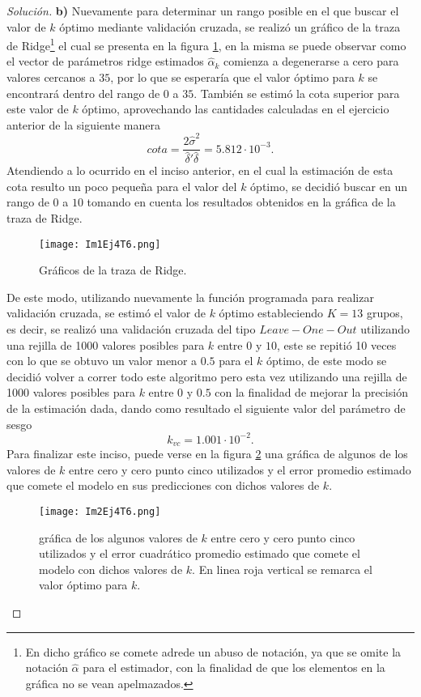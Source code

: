 \documentclass[10.5pt,notitlepage]{article}
\newenvironment{solucion}
  {\begin{proof}[Solución]}
  {\end{proof}}
\theoremstyle{plain}
\begin{document}
\begin{solucion}
\noindent\textbf{b)} Nuevamente para determinar un rango posible en el que buscar el valor de \(\mathit{k}\) óptimo mediante validación cruzada, se realizó un gráfico de la traza de Ridge\footnote{En dicho gráfico se comete adrede un abuso de notación, ya que se omite la notación \(\hat{\alpha}\) para el estimador, con la finalidad de que los elementos en la gráfica no se vean apelmazados.} el cual se presenta en la figura \ref{fig:11}, en la misma se puede observar como el vector de parámetros ridge estimados \(\hat{\alpha}_{k}\) comienza a degenerarse a cero para valores cercanos a \(35\), por lo que se esperaría que el valor óptimo para \(\mathit{k}\) se encontrará dentro del rango de \(0\) a \(35\). También se estimó la cota superior para este valor de \(k\) óptimo, aprovechando las cantidades calculadas en el ejercicio anterior de la siguiente manera 
\begin{equation*}
    cota = \frac{2\hat{\sigma}^2 }{\hat{\delta}'\hat{\delta}} = 5.812\cdot 10^{-3}.
\end{equation*}
Atendiendo a lo ocurrido en el inciso anterior, en el cual la estimación de esta cota resulto un poco pequeña para el valor del \(k\) óptimo, se decidió buscar en un rango de \(0\) a \(10\) tomando en cuenta los resultados obtenidos en la gráfica de la traza de Ridge. 
\begin{figure}[htb]
 \centering
 \texttt{[image: Im1Ej4T6.png]}
 \caption{Gráficos de la traza de Ridge.}
\label{fig:11}
\end{figure}
De este modo, utilizando nuevamente la función programada para realizar validación cruzada, se estimó el valor de \(k\) óptimo estableciendo \(K =13\) grupos, es decir, se realizó una validación cruzada del tipo \(Leave-One-Out\) utilizando una rejilla de 1000 valores posibles para \(k\) entre \(0\) y \(10\), este se repitió 10 veces con lo que se obtuvo un valor menor a \(0.5\) para el \(k\) óptimo, de este modo se decidió volver a correr todo este algoritmo pero esta vez utilizando una rejilla de 1000 valores posibles para \(k\) entre \(0\) y \(0.5\) con la finalidad de mejorar la precisión de la estimación dada, dando como resultado el siguiente valor del parámetro de sesgo
\begin{equation*}
    k_{vc}  = 1.001\cdot 10^{-2}.
\end{equation*}
Para finalizar este inciso, puede verse en la figura \ref{fig:chtmDembelé} una gráfica de algunos de los valores de \(\mathit{k}\) entre cero y cero punto cinco utilizados y el error promedio estimado que comete el modelo en sus predicciones con dichos valores de \(\mathit{k}\).\\ 
\begin{figure}[htb]
 \centering
 \texttt{[image: Im2Ej4T6.png]}
 \caption{gráfica de los algunos valores de \(\mathit{k}\) entre cero y cero punto cinco utilizados y el error cuadrático promedio estimado que comete el modelo con dichos valores de \(\mathit{k}\). En linea roja vertical se remarca el valor óptimo para \(k\).}
\label{fig:chtmDembelé}
\end{figure}


\end{solucion}
\end{document}
